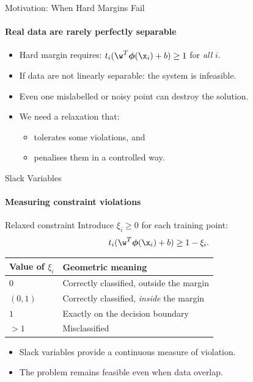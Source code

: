 \begin{frame}{Motivation: When Hard Margins Fail}
  \framesubtitle{Real data are rarely perfectly separable}
  \begin{itemize}
    \item Hard margin requires: $t_i(\w^T\boldsymbol{\phi}(\x_i)+b) \ge 1$ for \emph{all} $i$.
    \item If data are \alert{not linearly separable}: the system is infeasible.
    \item Even one mislabelled or noisy point can destroy the solution.
    \item We need a \alert{relaxation} that:
      \begin{itemize}
        \item tolerates some violations, and
        \item penalises them in a controlled way.
      \end{itemize}
  \end{itemize}
\end{frame}

\begin{frame}{Slack Variables}
  \framesubtitle{Measuring constraint violations}
  \begin{block}{Relaxed constraint}
    Introduce $\xi_i \ge 0$ for each training point:
    \[
      t_i(\w^T\boldsymbol{\phi}(\x_i)+b) \ge 1 - \xi_i.
    \]
  \end{block}
  \begin{center}
    \begin{tabular}{ll}
      \toprule
      Value of $\xi_i$ & Geometric meaning \\
      \midrule
      $0$ & Correctly classified, outside the margin \\
      $(0,1)$ & Correctly classified, \emph{inside} the margin \\
      $1$ & Exactly on the decision boundary \\
      $> 1$ & \alert{Misclassified} \\
      \bottomrule
    \end{tabular}
  \end{center}
  \begin{itemize}
    \item Slack variables provide a \alert{continuous} measure of violation.
    \item The problem remains feasible even when data overlap.
  \end{itemize}
\end{frame}

